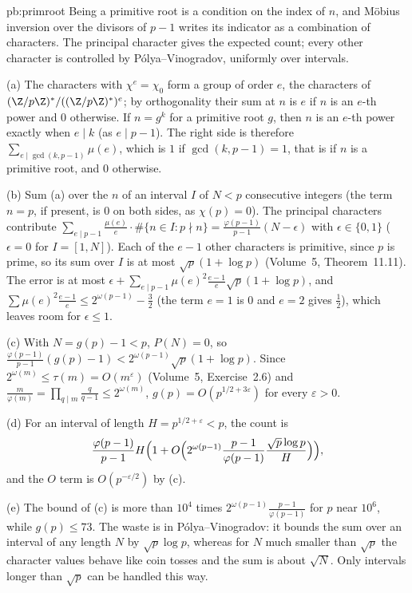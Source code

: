 \begin{solution}{pb:primroot}
\idea Being a primitive root is a condition on the index of $n$, and Möbius inversion over the divisors of $p-1$ writes its indicator as a combination of characters. The
principal character gives the expected count; every other character is controlled by Pólya--Vinogradov, uniformly over intervals.

\writeup (a) The characters with $\chi^e=\chi_0$ form a group of order $e$, the characters of $(\Z/p\Z)^*/((\Z/p\Z)^*)^e$; by orthogonality their sum at $n$ is $e$ if $n$ is an $e$-th power
and $0$ otherwise. If $n=g^k$ for a primitive root $g$, then $n$ is an $e$-th power exactly when $e\mid k$ (as $e\mid p-1$). The right side is therefore
$\sum_{e\mid\gcd(k,p-1)}\mu(e)$, which is $1$ if $\gcd(k,p-1)=1$, that is if $n$ is a primitive root, and $0$ otherwise.

(b) Sum (a) over the $n$ of an interval $I$ of $N<p$ consecutive integers (the term $n=p$, if present, is $0$ on both sides, as $\chi(p)=0$). The principal characters contribute
$\sum_{e\mid p-1}\frac{\mu(e)}e\cdot\#\{n\in I:p\nmid n\}=\frac{\varphi(p-1)}{p-1}(N-\epsilon)$ with $\epsilon\in\{0,1\}$ ($\epsilon=0$ for $I=[1,N]$). Each of the $e-1$ other characters is
primitive, since $p$ is prime, so its sum over $I$ is at most $\sqrt p(1+\log p)$ (Volume~5, Theorem~11.11). The error is at most
$\epsilon+\sum_{e\mid p-1}\mu(e)^2\frac{e-1}e\sqrt p(1+\log p)$, and $\sum\mu(e)^2\frac{e-1}e\le2^{\omega(p-1)}-\frac32$ (the term $e=1$ is $0$ and $e=2$ gives $\frac12$), which leaves room for $\epsilon\le1$.

(c) With $N=g(p)-1<p$, $P(N)=0$, so $\frac{\varphi(p-1)}{p-1}(g(p)-1)<2^{\omega(p-1)}\sqrt p(1+\log p)$. Since $2^{\omega(m)}\le\tau(m)=O(m^\varepsilon)$ (Volume~5, Exercise~2.6) and
$\frac m{\varphi(m)}=\prod_{q\mid m}\frac q{q-1}\le2^{\omega(m)}$, $g(p)=O(p^{1/2+3\varepsilon})$ for every $\varepsilon>0$.

(d) For an interval of length $H=p^{1/2+\varepsilon}<p$, the count is
\[
\frac{\varphi(p-1)}{p-1}H\Bigl(1+O\Bigl(2^{\omega(p-1)}\frac{p-1}{\varphi(p-1)}\frac{\sqrt p\log p}H\Bigr)\Bigr),
\]
and the $O$ term is
$O(p^{-\varepsilon/2})$ by (c).

(e) The bound of (c) is more than $10^4$ times $2^{\omega(p-1)}\frac{p-1}{\varphi(p-1)}$ for $p$ near $10^6$, while $g(p)\le73$. The waste is in Pólya--Vinogradov: it bounds the sum over an
interval of any length $N$ by $\sqrt p\log p$, whereas for $N$ much smaller than $\sqrt p$ the character values behave like coin tosses and the sum is about $\sqrt N$. Only
intervals longer than $\sqrt p$ can be handled this way.


\end{solution}
